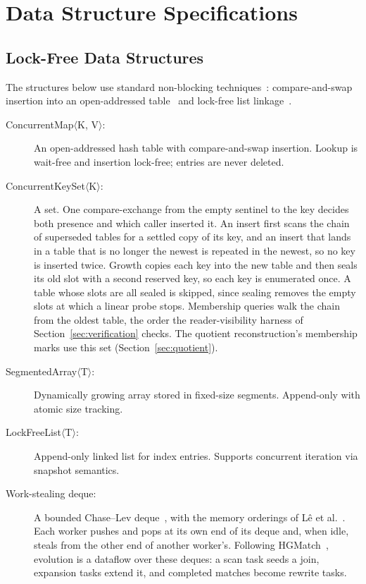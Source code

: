 \documentclass[9pt,twocolumn,a4paper]{extarticle}
\begin{document}
\section{Data Structure Specifications}
\label{app:data-structures}

\subsection{Lock-Free Data Structures}

The structures below use standard non-blocking techniques~\cite{herlihy2012art}: compare-and-swap
insertion into an open-addressed table~\cite{michael2002high} and lock-free list
linkage~\cite{harris2001pragmatic}.

\begin{description}
\item[ConcurrentMap$\langle$K, V$\rangle$:] An open-addressed hash table with compare-and-swap
insertion. Lookup is wait-free and insertion lock-free; entries are never deleted.

\item[ConcurrentKeySet$\langle$K$\rangle$:] A set. One compare-exchange from the empty sentinel to
the key decides both presence and which caller inserted it. An insert first scans the chain of
superseded tables for a settled copy of its key, and an insert that lands in a table that is no
longer the newest is repeated in the newest, so no key is inserted twice. Growth copies each key
into the new table and then seals its old slot with a second reserved key, so each key is
enumerated once. A table whose slots are all sealed is skipped, since sealing removes the empty
slots at which a linear probe stops. Membership queries walk the chain from the oldest table, the
order the reader-visibility harness of Section~\ref{sec:verification} checks. The quotient
reconstruction's membership marks use this set (Section~\ref{sec:quotient}).

\item[SegmentedArray$\langle$T$\rangle$:] Dynamically growing array stored in fixed-size segments. Append-only with atomic size tracking.

\item[LockFreeList$\langle$T$\rangle$:] Append-only linked list for index entries. Supports concurrent iteration via snapshot semantics.

\item[Work-stealing deque:] A bounded Chase--Lev deque~\cite{chase2005dynamic}, with the memory
orderings of L\^e et al.~\cite{le2013workstealing}. Each worker pushes and pops at its own end of
its deque and, when idle, steals from the other end of another worker's. Following
HGMatch~\cite{yang2023hgmatch}, evolution is a dataflow over these deques: a scan task seeds a
join, expansion tasks extend it, and completed matches become rewrite tasks.


\end{description}
\end{document}
